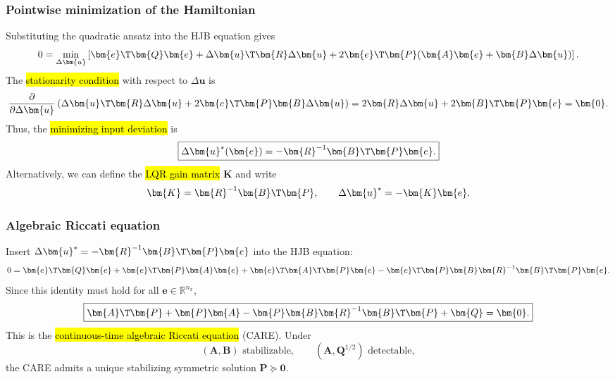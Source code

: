 \begin{frame}
	\frametitle{Pointwise minimization of the Hamiltonian}
	Substituting the quadratic ansatz into the HJB equation gives
	\begin{equation}
		0=\min_{\Delta\bm{u}}
		\left[\bm{e}\T\bm{Q}\bm{e}+\Delta\bm{u}\T\bm{R}\Delta\bm{u}
			+2\bm{e}\T\bm{P}(\bm{A}\bm{e}+\bm{B}\Delta\bm{u})\right].
	\end{equation}\pause%
	The \hl{stationarity condition} with respect to $\Delta\bm{u}$ is
	\begin{equation}
		\frac{\partial}{\partial \Delta\bm{u}}
		\left(\Delta\bm{u}\T\bm{R}\Delta\bm{u}+2\bm{e}\T\bm{P}\bm{B}\Delta\bm{u}\right)
		=2\bm{R}\Delta\bm{u}+2\bm{B}\T\bm{P}\bm{e}=\bm{0}.
	\end{equation}\pause%
	Thus, the \hl{minimizing input deviation} is
	\begin{equation}
		\boxed{\Delta\bm{u}^*(\bm{e})=-\bm{R}^{-1}\bm{B}\T\bm{P}\bm{e}.}
	\end{equation}\pause%
	Alternatively, we can define the \hl{LQR gain matrix} $\bm{K}$ and write
	\begin{equation}
		\bm{K}=\bm{R}^{-1}\bm{B}\T\bm{P},
		\qquad
		\Delta\bm{u}^*=-\bm{K}\bm{e}.
	\end{equation}
\end{frame}

\begin{frame}
	\frametitle{Algebraic Riccati equation}
	Insert $\Delta\bm{u}^*=-\bm{R}^{-1}\bm{B}\T\bm{P}\bm{e}$ into the HJB equation:
	\begin{equation}
		0=\bm{e}\T\bm{Q}\bm{e}
		+\bm{e}\T\bm{P}\bm{A}\bm{e}+\bm{e}\T\bm{A}\T\bm{P}\bm{e}
		-\bm{e}\T\bm{P}\bm{B}\bm{R}^{-1}\bm{B}\T\bm{P}\bm{e}.
	\end{equation}\pause%
	Since this identity must hold for all $\bm{e}\in\mathbb{R}^{n_x}$,
	\begin{equation}
		\boxed{\bm{A}\T\bm{P}+\bm{P}\bm{A}
			-\bm{P}\bm{B}\bm{R}^{-1}\bm{B}\T\bm{P}+\bm{Q}=\bm{0}.}
		\label{eq:CARE}
	\end{equation}\pause%
	This is the \hl{continuous-time algebraic Riccati equation} (CARE). Under
	\begin{equation}
		(\bm{A},\bm{B})\text{ stabilizable},
		\qquad
		(\bm{A},\bm{Q}^{1/2})\text{ detectable},
	\end{equation}
	the CARE admits a unique stabilizing symmetric solution $\bm{P}\succeq\bm{0}$.
\end{frame}

